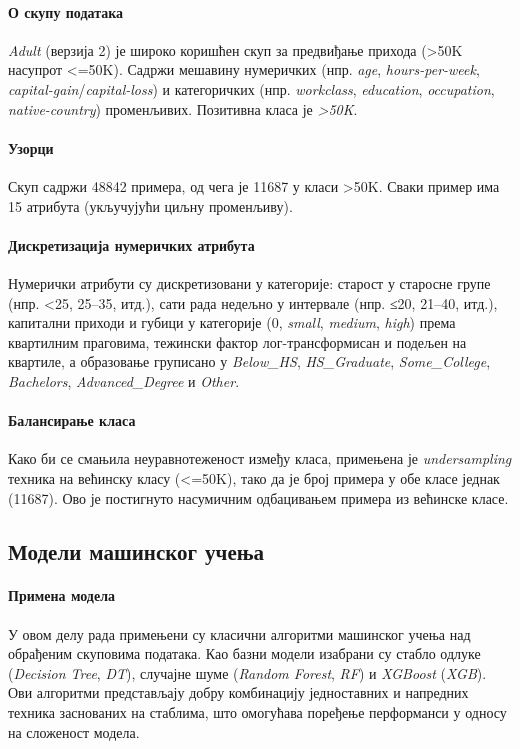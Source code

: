 \paragraph{О скупу података} \emph{Adult} (верзија 2) је широко коришћен скуп за предвиђање прихода (>50K насупрот <=50K). Садржи мешавину нумеричких (нпр. \textit{age}, \textit{hours-per-week}, \textit{capital-gain}/\textit{capital-loss}) и категоричких (нпр. \textit{workclass}, \textit{education}, \textit{occupation}, \textit{native-country}) променљивих. Позитивна класа је \textit{>50K}.

\paragraph{Узорци} Скуп садржи 48842 примера, од чега је 11687 у класи >50K. Сваки пример има 15 атрибута (укључујући циљну променљиву).

\paragraph{Дискретизација нумеричких атрибута} Нумерички атрибути су дискретизовани у категорије: старост у старосне групе (нпр. <25, 25–35, итд.), сати рада недељно у интервале (нпр. ≤20, 21–40, итд.), капитални приходи и губици у категорије (0, \textit{small}, \textit{medium}, \textit{high}) према квартилним праговима, тежински фактор лог-трансформисан и подељен на квартиле, а образовање груписано у \textit{Below\_HS}, \textit{HS\_Graduate}, \textit{Some\_College}, \textit{Bachelors}, \textit{Advanced\_Degree} и \textit{Other}.

\paragraph{Балансирање класа} Како би се смањила неуравнотеженост између класа, примењена је \textit{undersampling} техника на већинску класу (<=50K), тако да је број примера у обе класе једнак (11687). Ово је постигнуто насумичним одбацивањем примера из већинске класе.

\subsection{Модели машинског учења}
\paragraph{Примена модела} У овом делу рада примењени су класични алгоритми машинског учења над обрађеним скуповима података. Као базни модели изабрани су стабло одлуке (\emph{Decision Tree}, \textit{DT}), случајне шуме (\emph{Random Forest}, \textit{RF}) и \emph{XGBoost} (\textit{XGB}). Ови алгоритми представљају добру комбинацију једноставних и напредних техника заснованих на стаблима, што омогућава поређење перформанси у односу на сложеност модела.

